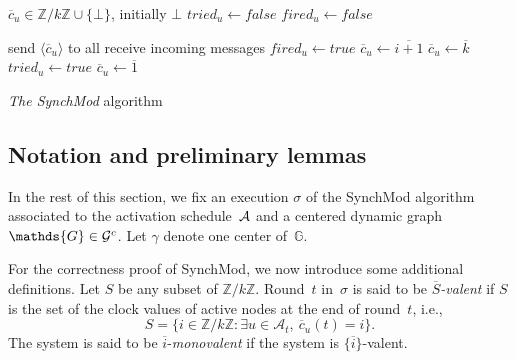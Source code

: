 \documentclass{article}
\newcommand{\cent}{\gamma}
\newcommand{\dG}{\mathds{G}}
\begin{document}
\begin{algorithm}[htb]\label{algo:code}
\begin{distribalgo}[1]
\BLANK {}
	\STATE $\overline{c}_u \in \mathds{Z}/k\mathds{Z} \cup \{\bot\}$, initially $\bot$
	\STATE $tried_u \leftarrow false$
	\STATE $fired_u \leftarrow false$

\ENDINDENT \BLANK

	\STATE send $\langle \overline{c}_u \rangle$ to all 
	\STATE receive incoming messages
		\STATE $fired_u \leftarrow true$ \label{line:fire}
	\ENDIF
		\STATE $\overline{c}_u \leftarrow \overline{i+1} $ \label{line:agreed}
	\ELSE {}
		\STATE $\overline{c}_u \leftarrow \overline{k} $  \label{line:try}
		\STATE $tried_u \leftarrow true$   \label{line:try+1}%
		\ELSE
		\STATE $\overline{c}_u \leftarrow \overline{1} $ \label{line:tried}%
	  \ENDIF
	  \ENDIF
\ENDINDENT 

\caption{{\em The SynchMod} algorithm} \label{algo:R}
\end{distribalgo}

\end{algorithm}


\subsection{Notation and preliminary lemmas}

In the rest of this section, we fix an execution $\sigma$ of the SynchMod algorithm associated to the activation 
	schedule~${\cal A}$ and a centered dynamic graph~$\dG \in {\cal G}^c$. %
Let $\cent$ denote one center of~$\dG$.	

For the correctness proof of SynchMod, we now introduce some additional definitions.
Let $S$ be any subset of $ \mathds{Z}/k\mathds{Z}$.
Round~$t$ in~$\sigma$  is said to be \emph{$\overline{S}$-valent}  if $S$ is the set of the clock values of active nodes at the end of round~$t$, i.e.,
	$$ S = \{i  \in \mathds{Z}/k\mathds{Z} : \exists u \in \mathcal{A}_t, \ \overline{c}_u (t) = i \}  . $$
The system is said to be $\overline{i}$-\emph{monovalent}  if the system is $\{ \overline{i}\}$-valent.
\end{document}
